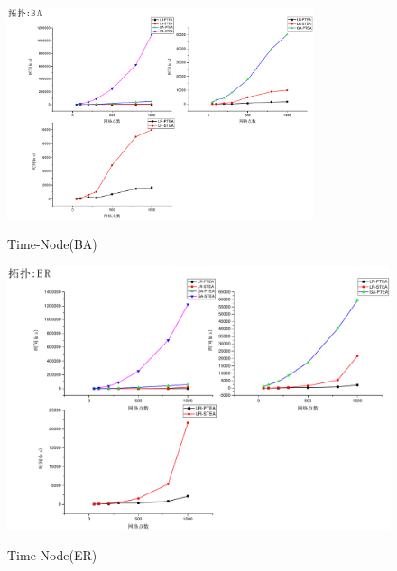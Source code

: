 \begin{figure}
\setlength{\belowcaptionskip}{-0.1cm}
\begin{center}
{\includegraphics[width=0.8\textwidth]{figures/TI-BA-NO.pdf}}
\end{center}
\caption{{\footnotesize{Time-Node(BA)}}}
\label{TI-BA-NO}
\end{figure}
\begin{figure}
\setlength{\belowcaptionskip}{-0.1cm}
\begin{center}
{\includegraphics[width=0.8 \textwidth]{figures/TI-ER-NO.pdf}}
\end{center}
\caption{{\footnotesize{Time-Node(ER)}}}
\label{TI-ER-NO}
\end{figure}
